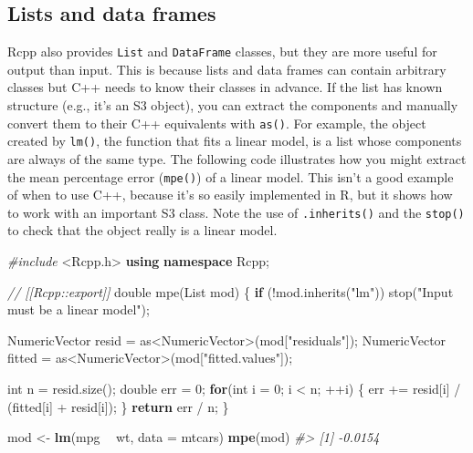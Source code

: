 \documentclass[]{book}
\newenvironment{Shaded}{\begin{snugshade}}{\end{snugshade}}
\newcommand{\CommentTok}[1]{\textcolor[rgb]{0.37,0.37,0.37}{\textit{#1}}}
\newcommand{\ControlFlowTok}[1]{\textcolor[rgb]{0.27,0.27,0.27}{\textbf{#1}}}
\newcommand{\DataTypeTok}[1]{\textcolor[rgb]{0.27,0.27,0.27}{#1}}
\newcommand{\DecValTok}[1]{\textcolor[rgb]{0.06,0.06,0.06}{#1}}
\newcommand{\ImportTok}[1]{#1}
\newcommand{\KeywordTok}[1]{\textcolor[rgb]{0.27,0.27,0.27}{\textbf{#1}}}
\newcommand{\NormalTok}[1]{#1}
\newcommand{\OperatorTok}[1]{\textcolor[rgb]{0.43,0.43,0.43}{\textbf{#1}}}
\newcommand{\PreprocessorTok}[1]{\textcolor[rgb]{0.37,0.37,0.37}{\textit{#1}}}
\newcommand{\StringTok}[1]{\textcolor[rgb]{0.5,0.5,0.5}{#1}}
\begin{document}
\hypertarget{lists-and-data-frames}{%
\subsection{Lists and data frames}\label{lists-and-data-frames}}

Rcpp also provides \texttt{List} and \texttt{DataFrame} classes, but they are more useful for output than input. This is because lists and data frames can contain arbitrary classes but C++ needs to know their classes in advance. If the list has known structure (e.g., it's an S3 object), you can extract the components and manually convert them to their C++ equivalents with \texttt{as()}. For example, the object created by \texttt{lm()}, the function that fits a linear model, is a list whose components are always of the same type. The following code illustrates how you might extract the mean percentage error (\texttt{mpe()}) of a linear model. This isn't a good example of when to use C++, because it's so easily implemented in R, but it shows how to work with an important S3 class. Note the use of \texttt{.inherits()} and the \texttt{stop()} to check that the object really is a linear model.  

\begin{Shaded}
\begin{Highlighting}[]
\PreprocessorTok{#include }\ImportTok{<Rcpp.h>}
\KeywordTok{using} \KeywordTok{namespace}\NormalTok{ Rcpp;}

\CommentTok{// [[Rcpp::export]]}
\DataTypeTok{double}\NormalTok{ mpe(List mod) \{}
  \ControlFlowTok{if}\NormalTok{ (!mod.inherits(}\StringTok{"lm"}\NormalTok{)) stop(}\StringTok{"Input must be a linear model"}\NormalTok{);}

\NormalTok{  NumericVector resid = as<NumericVector>(mod[}\StringTok{"residuals"}\NormalTok{]);}
\NormalTok{  NumericVector fitted = as<NumericVector>(mod[}\StringTok{"fitted.values"}\NormalTok{]);}

  \DataTypeTok{int}\NormalTok{ n = resid.size();}
  \DataTypeTok{double}\NormalTok{ err = }\DecValTok{0}\NormalTok{;}
  \ControlFlowTok{for}\NormalTok{(}\DataTypeTok{int}\NormalTok{ i = }\DecValTok{0}\NormalTok{; i < n; ++i) \{}
\NormalTok{    err += resid[i] / (fitted[i] + resid[i]);}
\NormalTok{  \}}
  \ControlFlowTok{return}\NormalTok{ err / n;}
\NormalTok{\}}
\end{Highlighting}
\end{Shaded}

\begin{Shaded}
\begin{Highlighting}[]
\NormalTok{mod <-}\StringTok{ }\KeywordTok{lm}\NormalTok{(mpg }\OperatorTok{~}\StringTok{ }\NormalTok{wt, }\DataTypeTok{data =}\NormalTok{ mtcars)}
\KeywordTok{mpe}\NormalTok{(mod)}
\CommentTok{#> [1] -0.0154}
\end{Highlighting}
\end{Shaded}
\end{document}
